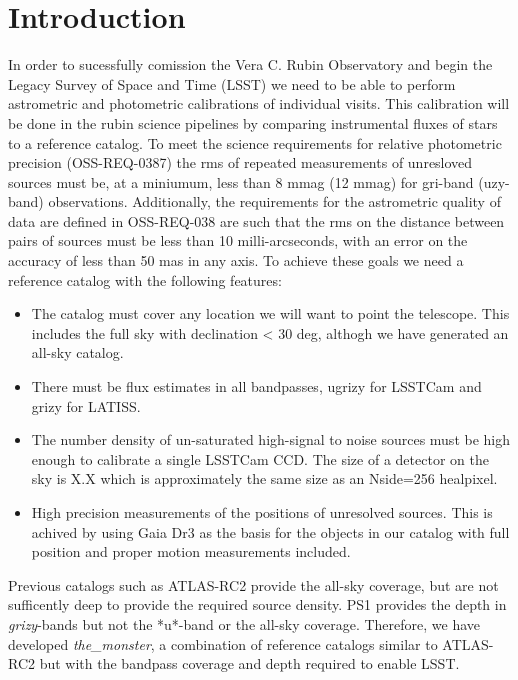 \section{Introduction}
In order to sucessfully comission the Vera C. Rubin Observatory and begin the Legacy Survey of Space and Time (LSST) we need to be able to perform astrometric and photometric calibrations of individual visits. 
This calibration will be done in the rubin science pipelines by comparing instrumental fluxes of stars to a reference catalog.
To meet the science requirements for relative photometric precision (OSS-REQ-0387) the rms of repeated measurements of unresloved sources must be, at a miniumum, less than 8 mmag (12 mmag) for gri-band (uzy-band) observations. 
Additionally, the requirements for the astrometric quality of data are defined in OSS-REQ-038 are such that the rms on the distance between pairs of sources must be less than 10 milli-arcseconds, with an error on the accuracy of less than 50 mas in any axis. 
To achieve these goals we need a reference catalog with the following features:

\begin{itemize}
    \item The catalog must cover any location we will want to point the telescope. This includes the full sky with declination < 30 deg, althogh we have generated an all-sky catalog. 
    \item There must be flux estimates in all bandpasses, ugrizy for LSSTCam and grizy for LATISS. 
    \item The number density of un-saturated high-signal to noise sources must be high enough to calibrate a single LSSTCam CCD. 
    The size of a detector on the sky is X.X which is approximately the same size as an Nside=256 healpixel. 
    \item High precision measurements of the positions of unresolved sources. 
    This is achived by using Gaia Dr3 as the basis for the objects in our catalog with full position and proper motion measurements included. 
    
\end{itemize}

Previous catalogs such as ATLAS-RC2 provide the all-sky coverage, but are not sufficently deep to provide the required source density. 
PS1 provides the depth in \emph{grizy}-bands but not the *u*-band or the all-sky coverage. 
Therefore, we have developed \emph{the\_monster}, a combination of reference catalogs similar to ATLAS-RC2 but with the bandpass coverage and depth required to enable LSST. 

